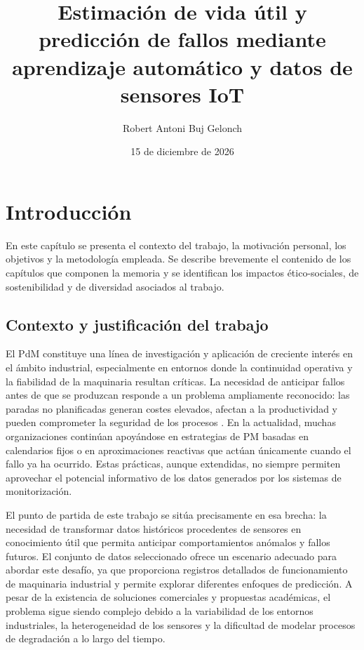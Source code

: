 \documentclass[IB]{TFUOC}
\title{Estimación de vida útil y predicción de fallos mediante aprendizaje automático y datos de sensores IoT}
\author{Robert Antoni Buj Gelonch}
\date{15 de diciembre de 2026}
\begin{document}
\estructura

\tableofcontents

\listoffigures

\listoftables

\listoflistings

\chapter{Introducción}

En este capítulo se presenta el contexto del trabajo, la motivación personal, los objetivos y la metodología empleada.
Se describe brevemente el contenido de los capítulos que componen la memoria y se identifican los impactos
ético-sociales, de sostenibilidad y de diversidad asociados al trabajo.

\section{Contexto y justificación del trabajo}

El \gls{PdM} constituye una línea de investigación y aplicación de creciente interés en el ámbito industrial,
especialmente en entornos donde la continuidad operativa y la fiabilidad de la maquinaria resultan críticas. La
necesidad de anticipar fallos antes de que se produzcan responde a un problema ampliamente reconocido: las paradas no
planificadas generan costes elevados, afectan a la productividad y pueden comprometer la seguridad de los procesos
\cite{mobley2002benefits}. En la actualidad, muchas organizaciones continúan apoyándose en estrategias de \gls{PM}
basadas en calendarios fijos o en aproximaciones reactivas que actúan únicamente cuando el fallo ya ha ocurrido. Estas
prácticas, aunque extendidas, no siempre permiten aprovechar el potencial informativo de los datos generados por los
sistemas de monitorización.

El punto de partida de este trabajo se sitúa precisamente en esa brecha: la necesidad de transformar datos históricos
procedentes de sensores en conocimiento útil que permita anticipar comportamientos anómalos y fallos futuros. El
conjunto de datos seleccionado \cite{biswas_microsoft_azure_predictive_maintenance} ofrece un escenario adecuado para
abordar este desafío, ya que proporciona registros detallados de funcionamiento de maquinaria industrial y permite
explorar diferentes enfoques de predicción. A pesar de la existencia de soluciones comerciales y propuestas académicas,
el problema sigue siendo complejo debido a la variabilidad de los entornos industriales, la heterogeneidad de los
sensores y la dificultad de modelar procesos de degradación a lo largo del tiempo.
\end{document}
